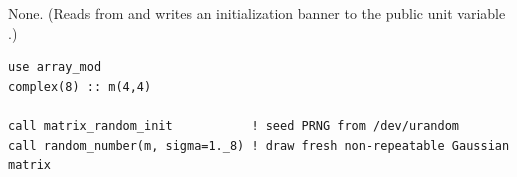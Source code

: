 None. (Reads from  and writes an initialization banner to the public unit variable .)

\lstset{language=[95]Fortran}
\begin{lstlisting}
use array_mod
complex(8) :: m(4,4)

call matrix_random_init           ! seed PRNG from /dev/urandom
call random_number(m, sigma=1._8) ! draw fresh non-repeatable Gaussian matrix
\end{lstlisting}
